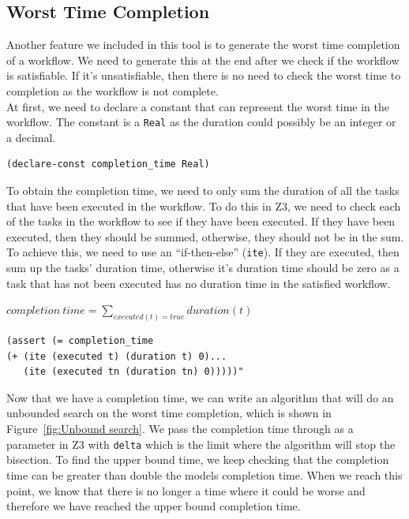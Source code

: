 \documentclass[a4paper]{report}
\begin{document}
\subsection{Worst Time Completion}
Another feature we included in this tool is to generate the worst time completion of a workflow. We need to generate this at the end after we check if the workflow is satisfiable. If it's unsatisfiable, then there is no need to check the worst time to completion as the workflow is not complete.\\

At first, we need to declare a constant that can represent the worst time in the workflow. The constant is a \texttt{Real} as the duration could possibly be an integer or a decimal. 
\begin{lstlisting}[frame=single]
(declare-const completion_time Real)
\end{lstlisting}

To obtain the completion time, we need to only sum the duration of all the tasks that have been executed in the workflow. To do this in Z3, we need to check each of the tasks in the workflow to see if they have been executed. If they have been executed, then they should be summed, otherwise, they should not be in the sum. To achieve this, we need to use an ``if-then-else'' (\texttt{ite}). If they are executed, then sum up the tasks' duration time, otherwise it's duration time should be zero as a task that has not been executed has no duration time in the satisfied workflow.
\begin{center}
$completion\ time = \sum\nolimits_{executed(t) = true} duration(t)$
\end{center}

\begin{lstlisting}[frame=single]
(assert (= completion_time
(+ (ite (executed t) (duration t) 0)...
   (ite (executed tn (duration tn) 0)))))"
\end{lstlisting}

Now that we have a completion time, we can write an algorithm that will do an unbounded search on the worst time completion, which is shown in Figure~\ref{fig:Unbound search}. We pass the completion time through as a parameter in Z3 with \texttt{delta} which is the limit where the algorithm will stop the bisection. To find the upper bound time, we keep checking that the completion time can be greater than double the models completion time. When we reach this point, we know that there is no longer a time where it could be worse and therefore we have reached the upper bound completion time. \\
\end{document}
